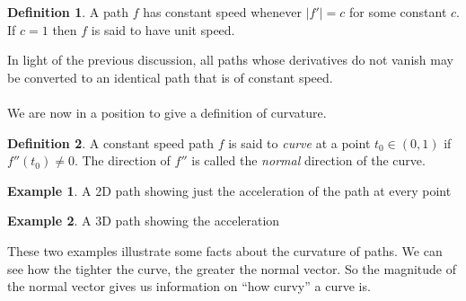\documentclass[]{article}
\newcommand\<{\ensuremath{\left\langle}}
\renewcommand\>{\ensuremath{\right\rangle}}
\theoremstyle{definition}
\newtheorem{definition}{Definition}[section]
\theoremstyle{definition}
\newtheorem{example}{Example}[section]
\begin{document}
	\begin{definition}
		A path $f$ has constant speed whenever $|f'| = c$ for some constant $c$. If $c = 1$ then $f$ is said to have unit speed. 
	\end{definition}
	In light of the previous discussion, all paths whose derivatives do not vanish may be converted to an identical path that is of constant speed.\\
	\\
	We are now in a position to give a definition of curvature. 
	\begin{definition}
		A constant speed path $f$ is said to \textit{curve} at a point $t_0 \in (0,1)$ if $f''(t_0) \neq 0$. The direction of $f''$ is called the \textit{normal} direction of the curve.
	\end{definition}
	\begin{example}
		A 2D path showing just the acceleration of the path at every point
	\end{example}
	\begin{example}
		A 3D path showing the acceleration
	\end{example}
	These two examples illustrate some facts about the curvature of paths. We can see how the tighter the curve, the greater the normal vector. So the magnitude of the normal vector gives us information on ``how curvy'' a curve is.
	
\end{document}
